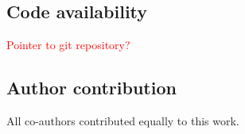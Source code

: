 \documentclass[sn-mathphys-num,a4paper,iicol,lineno,pdflatex]{sn-jnl-hacked}
\theoremstyle{thmwithspace}%
\theoremstyle{thmwithspace}%
\begin{document}
\subsection*{Code availability}

\textcolor{red}{Pointer to git repository?}

\subsection*{Author contribution}

All co-authors contributed equally to this work.

\begin{appendices}



\end{appendices}



\end{document}
